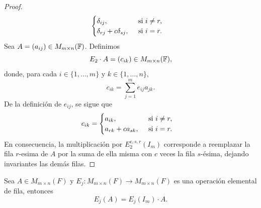 \documentclass[12pt,a4paper]{book}
\begin{document}
\begin{proof}
\begin{equation*}
            \begin{cases}
                \delta_{ij},\hfill\text{ si }i\neq r,\\
                \delta_{rj}+c\delta_{sj},\quad\text{ si }i=r.
            \end{cases}
        \end{equation*}
        Sea $A=(a_{ij})\in M_{m\times n}(\mathbb{F})$. Definimos
        \begin{equation*}
            E_{2}\cdot A=(c_{ik})\in M_{m\times n}(\mathbb{F}),
        \end{equation*}
        donde, para cada $i\in\{1,\dots,m\}$ y $k\in\{1,\dots,n\}$,
        \begin{equation*}
            c_{ik}=\sum_{j=1}^{m}e_{ij}a_{jk}.
        \end{equation*}
        De la definición de $e_{ij}$, se sigue que
        \begin{equation*}
            c_{ik}=
            \begin{cases}
                a_{ik},\hfill\text{ si }i\neq r,\\
                a_{rk}+ca_{sk},\quad\text{ si }i=r.
            \end{cases}
        \end{equation*}
        En consecuencia, la multiplicación por $E_{2}^{c,s,r}(I_{m})$ corresponde a reemplazar la fila $r$-esima de $A$ por la suma de ella misma con $c$ veces la fila $s$-ésima, dejando
        invariantes las demás filas.
    \end{proof}

    \vspace{1cm}

    \begin{proposicion}
        Sea $A\in M_{m\times n}(F)$ y $E_{j}:M_{m\times n}(F)\to M_{m\times n}(F)$ es
        una operación elemental de fila, entonces
        \begin{equation*}
            E_{j}(A)=E_{j}(I_{m})\cdot A.
        \end{equation*}
    \end{proposicion}
\end{document}
